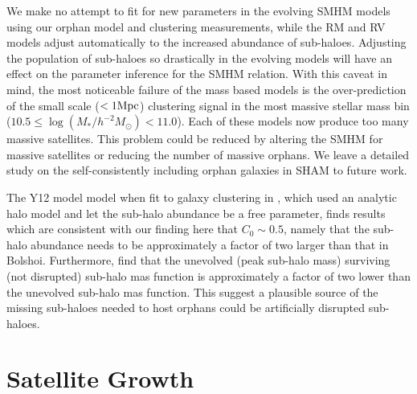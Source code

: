 \documentclass[a4paper,fleqn,usenatbib]{mnras}
\begin{document}
We make no attempt to fit for new parameters in the evolving SMHM models using our orphan model and clustering measurements, while the RM and RV models adjust automatically to the increased abundance of sub-haloes.  Adjusting the population of sub-haloes so drastically in the evolving models will have an effect on the parameter inference for the SMHM relation.  With this caveat in mind, the most noticeable failure of the mass based models is the over-prediction of the small scale ($< 1 {\rm Mpc}$) clustering signal in the most massive stellar mass bin ($10.5\leq \log(M_*/h^{-2}M_{\odot})<11.0$).  Each of these models now produce too many massive satellites.  This problem could be reduced by altering the SMHM for massive satellites or reducing the number of massive orphans.  We leave a detailed study on the self-consistently including orphan galaxies in SHAM to future work.

The Y12 model model when fit to galaxy clustering in \cite{Yang:2012ew}, which used an analytic halo model and let the sub-halo abundance be a free parameter, finds results which are consistent with our finding here that $C_0 \sim 0.5$, namely that the sub-halo abundance needs to be approximately a factor of two larger than that in Bolshoi.  Furthermore, \cite{Jiang:2016dw} find that the unevolved (peak sub-halo mass) surviving (not disrupted) sub-halo mas function is approximately a factor of two lower than the unevolved sub-halo mas function.  This suggest a plausible source of the missing sub-haloes needed to host orphans could be artificially disrupted sub-haloes.


\section{Satellite Growth}
\label{sec:sat_growth}  
\end{document}
